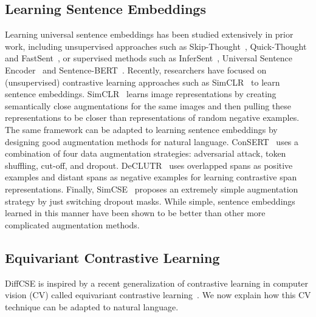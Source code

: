 \documentclass[11pt]{article}
\newcommand{\diffcse}{DiffCSE\xspace}
\begin{document}
\subsection{Learning Sentence Embeddings}
Learning universal sentence embeddings has been studied extensively in prior work, including unsupervised approaches such as Skip-Thought~\cite{kiros2015skip-thought}, Quick-Thought~\cite{logeswaran2018an-quick-thought} and FastSent~\cite{hill2016learning}, or supervised methods such as InferSent~\cite{conneau2017supervised}, Universal Sentence Encoder~\cite{cer2018universal} and Sentence-BERT~\cite{reimers2019sentence}. Recently, researchers have focused on (unsupervised) contrastive learning approaches such as SimCLR~\cite{chen2020simple} to learn sentence embeddings.
SimCLR~\cite{chen2020simple} learns image representations by creating semantically close augmentations for the same images and then pulling these representations to be closer than representations of random negative examples. The same framework can be adapted to learning sentence embeddings by designing good augmentation methods for natural language.
ConSERT~\cite{yan2021consert} uses a combination of four data augmentation strategies: adversarial attack, token shuffling, cut-off, and dropout.
DeCLUTR~\cite{giorgi2020declutr} uses overlapped spans as positive examples and distant spans as negative examples for learning contrastive span representations.
Finally, SimCSE~\cite{gao2021simcse} proposes an extremely simple augmentation strategy by just switching dropout masks. While simple, sentence embeddings learned in this manner have been shown to be better than other more complicated augmentation methods.


\subsection{Equivariant Contrastive Learning}
\label{sec:ecl}
\diffcse is inspired by  a recent generalization of contrastive learning in computer vision (CV) called equivariant contrastive learning~\citep{dangovski2021equivariant}. We now explain how this CV  technique can be adapted to natural language.
\end{document}
